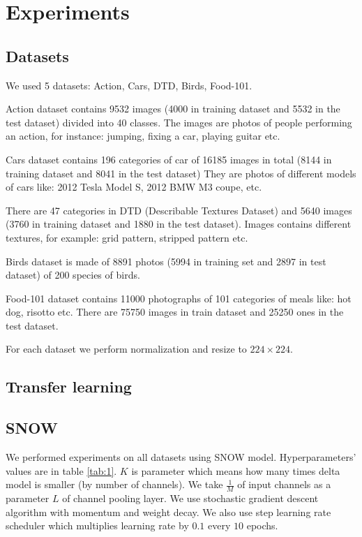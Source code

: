 \documentclass[12pt]{article}
\begin{document}
    \section{Experiments}

    \subsection{Datasets}

    We used 5 datasets: Action, Cars, DTD, Birds, Food-101.

    Action dataset contains 9532 images (4000 in training dataset and 5532 in the test dataset) divided into 40 classes.
    The images are photos of people performing an action, for instance: jumping, fixing a car, playing guitar etc.

    Cars dataset contains 196 categories of car of 16185 images in total (8144 in training dataset and 8041 in the test dataset)
    They are photos of different models of cars like: 2012 Tesla Model S, 2012 BMW M3 coupe, etc.

    There are 47 categories in DTD (Describable Textures Dataset) and 5640 images (3760 in training dataset and 1880 in the test dataset).
    Images contains different textures, for example: grid pattern, stripped pattern etc.

    Birds dataset is made of 8891 photos (5994 in training set and 2897 in test dataset) of 200 species of birds.

    Food-101 dataset contains 11000 photographs of 101 categories of meals like: hot dog, risotto etc.
    There are 75750 images in train dataset and 25250 ones in the test dataset.

    For each dataset we perform normalization and resize to $224\times224$.

    \subsection{Transfer learning}

    \subsection{SNOW}

    We performed experiments on all datasets using SNOW model.
    Hyperparameters' values are in table \ref{tab:1}.
    $K$ is parameter which means how many times delta model is smaller (by number of channels).
    We take $\frac{1}{M}$ of input channels as a parameter $L$ of channel pooling layer.
    We use stochastic gradient descent algorithm with momentum and weight decay.
    We also use step learning rate scheduler which multiplies learning rate by $0.1$ every $10$ epochs.
\end{document}
